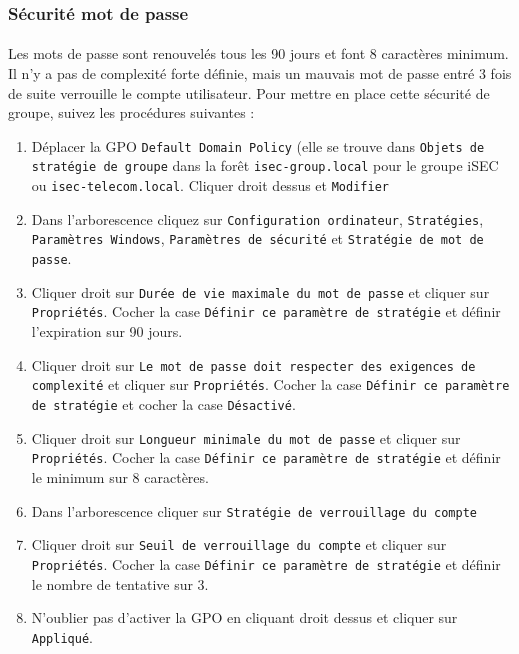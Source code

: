 		\subsubsection{Sécurité mot de passe}
			\paragraph{}
				Les mots de passe sont renouvelés tous les 90 jours et font 8 caractères minimum. Il n'y a pas de complexité forte définie, mais un mauvais mot de passe entré 3 fois de suite verrouille le compte utilisateur. Pour mettre en place cette sécurité de groupe, suivez les procédures suivantes :
				\begin{enumerate}
					\item Déplacer la GPO \texttt{Default Domain Policy} (elle se trouve dans \texttt{Objets de stratégie de groupe} dans la forêt \texttt{isec-group.local} pour le groupe iSEC ou \texttt{isec-telecom.local}. Cliquer droit dessus et \texttt{Modifier}
					\item Dans l'arborescence cliquez sur \texttt{Configuration ordinateur}, \texttt{Stratégies}, \texttt{Paramètres Windows}, \texttt{Paramètres de sécurité} et \texttt{Stratégie de mot de passe}. 
					\item Cliquer droit sur \texttt{Durée de vie maximale du mot de passe} et cliquer sur \texttt{Propriétés}. Cocher la case \texttt{Définir ce paramètre de stratégie} et définir l'expiration sur 90 jours.
					\item Cliquer droit sur \texttt{Le mot de passe doit respecter des exigences de complexité} et cliquer sur \texttt{Propriétés}. Cocher la case \texttt{Définir ce paramètre de stratégie} et cocher la case \texttt{Désactivé}.
					\item Cliquer droit sur \texttt{Longueur minimale du mot de passe} et cliquer sur \texttt{Propriétés}. Cocher la case \texttt{Définir ce paramètre de stratégie} et définir le minimum sur 8 caractères.
					\item Dans l'arborescence cliquer sur \texttt{Stratégie de verrouillage du compte}
					\item Cliquer droit sur \texttt{Seuil de verrouillage du compte} et cliquer sur \texttt{Propriétés}. Cocher la case \texttt{Définir ce paramètre de stratégie} et définir le nombre de tentative sur 3.
					\item N'oublier pas d'activer la GPO en cliquant droit dessus et cliquer sur \texttt{Appliqué}.
				\end{enumerate}
